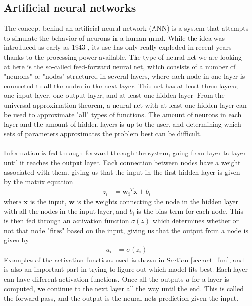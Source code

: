 \documentclass[a4paper]{article}
\begin{document}
\subsection{Artificial neural networks}
The concept behind an artificial neural network (ANN) is a system that attempts to simulate the behavior of neurons in a human mind. While the idea was introduced as early as 1943 \cite{mcculloch43a}, its use has only really exploded in recent years thanks to the processing power available. The type of neural net we are looking at here is the so-called feed-forward neural net, which consists of a number of "neurons" or "nodes" structured in several layers, where each node in one layer is connected to all the nodes in the next layer. This net has at least three layers; one input layer, one output layer, and at least one hidden layer. From the universal approximation theorem, a neural net with at least one hidden layer can be used to approximate "all" types of functions. The amount of neurons in each layer and the amount of hidden layers is up to the user, and determining which sets of parameters approximates the problem best can be difficult.
\\\\
Information is fed through forward through the system, going from layer to layer until it reaches the output layer. Each connection between nodes have a weight associated with them, giving us that the input in the first hidden layer is given by the matrix equation
\begin{align*}
	z_i &= \mathbf{w_i}^T \mathbf{x} + b_i
\end{align*}
where $\mathbf{x}$ is the input, $\mathbf{w}$ is the weights connecting the node in the hidden layer with all the nodes in the input layer, and $b_i$ is the bias term for each node. This is then fed through an activation function $\sigma(z)$ which determines whether or not that node "fires" based on the input, giving us that the output from a node is given by
\begin{align*}
	a_i &= \sigma(z_i) 
\end{align*}
Examples of the activation functions used is shown in Section \ref{sec:act_fun}, and is also an important part in trying to figure out which model fits best. Each layer can have different activation functions. Once all the outputs $a$ for a layer is computed, we continue to the next layer all the way until the end. This is called the forward pass, and the output is the neural nets prediction given the input.
\end{document}
